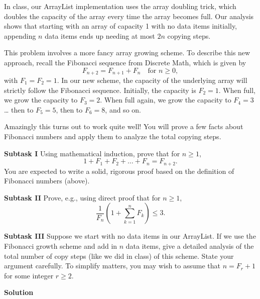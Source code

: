 \documentclass{article}
\newcommand{\solution}{\textbf{\large Solution}}
\theoremstyle{remark}
\begin{document}
  In class, our ArrayList implementation uses the array doubling trick, which doubles the capacity of
  the array every time the array becomes full. Our analysis shows that starting with an array of capacity 1
  with no data items initially, appending $n$ data items ends up needing at most $2n$ copying steps.

  This problem involves a more fancy array growing scheme. To describe this new approach, recall
  the Fibonacci sequence from Discrete Math, which is given by
  \[
      F_{n+2} = F_{n+1} + F_n \quad \text{for } n \ge 0,
  \]
  with $F_1 = F_2 = 1$. In our new scheme, the capacity of the underlying array will strictly follow the
  Fibonacci sequence. Initially, the capacity is $F_2 = 1$. When full, we grow the capacity to $F_3 = 2$.
  When full again, we grow the capacity to $F_4 = 3$\ldots{} then to $F_5 = 5$, then to $F_6 = 8$, and so on.

  Amazingly this turns out to work quite well! You will prove a few facts about Fibonacci numbers and
  apply them to analyze the total copying steps.

  \textbf{Subtask I} Using mathematical induction, prove that for $n \ge 1$,
  \[
      1 + F_1 + F_2 + \dots + F_n = F_{n+2}.
  \]
  You are expected to write a solid, rigorous proof based on the definition of Fibonacci numbers (above).

  \textbf{Subtask II} Prove, e.g., using direct proof that for $n \ge 1$,
  \[
      \frac{1}{F_n} \left(1 + \sum_{k=1}^{n} F_k \right) \le 3.
  \]

  \textbf{Subtask III} Suppose we start with no data items in our ArrayList. If we use the Fibonacci growth
  scheme and add in $n$ data items, give a detailed analysis of the total number of copy steps (like we did in
  class) of this scheme. State your argument carefully. To simplify matters, you may wish to assume that
  $n = F_r + 1$ for some integer $r \ge 2$.

  \medskip
  \solution
\end{document}
